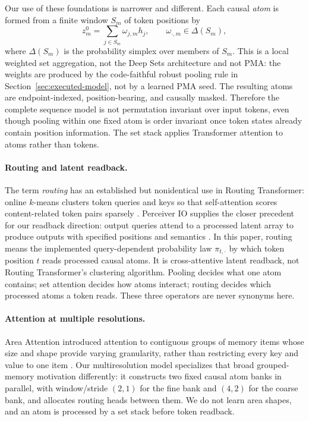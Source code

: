 \documentclass{article}
\theoremstyle{plain}
\theoremstyle{definition}
\theoremstyle{remark}
\begin{document}
Our use of these foundations is narrower and different.  Each causal
\emph{atom} is formed from a finite window $S_m$ of token positions by
\begin{equation}
\label{eq:background-local-pooling}
z_m^0=\sum_{j\in S_m}\omega_{j,m}h_j,
\qquad \omega_{\cdot,m}\in\Delta(S_m),
\end{equation}
where $\Delta(S_m)$ is the probability simplex over members of $S_m$.  This is
a local weighted set aggregation, not the Deep Sets architecture and not PMA:
the weights are produced by the code-faithful robust pooling rule in
Section~\ref{sec:executed-model}, not by a learned PMA seed.  The resulting
atoms are endpoint-indexed, position-bearing, and causally masked.  Therefore
the complete sequence model is not permutation invariant over input tokens,
even though pooling within one fixed atom is order invariant once token states
already contain position information.  The set stack applies Transformer
attention to atoms rather than tokens.

\paragraph{Routing and latent readback.}
The term \emph{routing} has an established but nonidentical use in Routing
Transformer: online $k$-means clusters token queries and keys so that
self-attention scores content-related token pairs sparsely
\citep{roy2020routing}.  Perceiver IO supplies the closer precedent for our
readback direction: output queries attend to a processed latent array to
produce outputs with specified positions and semantics
\citep{jaegle2021perceiverio}.  In this paper, routing means the implemented
query-dependent probability law $\pi_{t,\cdot}$ by which token position $t$
reads processed causal atoms.  It is cross-attentive latent readback, not
Routing Transformer's clustering algorithm.  Pooling decides what one atom
contains; set attention decides how atoms interact; routing decides which
processed atoms a token reads.  These three operators are never synonyms here.

\paragraph{Attention at multiple resolutions.}
Area Attention introduced attention to contiguous groups of memory items whose
size and shape provide varying granularity, rather than restricting every key
and value to one item \citep{li2019areaattention}.  Our multiresolution model
specializes that broad grouped-memory motivation differently: it constructs
two fixed causal atom banks in parallel, with window/stride $(2,1)$ for the
fine bank and $(4,2)$ for the coarse bank, and allocates routing heads between
them.  We do not learn area shapes, and an atom is processed by a set stack
before token readback.
\end{document}
